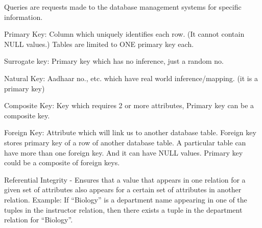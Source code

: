 \documentclass[8pt, a4paper, oneside, twocolumn]{extarticle}
\begin{document}
Queries are requests made to the database management systems for specific information.

Primary Key: Column which uniquely identifies each row. (It cannot contain NULL values.) Tables are limited to ONE primary key each.

Surrogate key: Primary key which has no inference, just a random no.

Natural Key: Aadhaar no., etc. which have real world inference/mapping. (it is a primary key)

Composite Key: Key which requires 2 or more attributes, Primary key can be a composite key. 

Foreign Key: Attribute which will link us to another database table. Foreign key stores primary key of a row of another database table. A particular table can have more than one foreign key. And it can have NULL values. Primary key could be a composite of foreign keys.

Referential Integrity - Ensures that a value that appears in one relation for a given set of attributes also appears for a certain set of attributes in another relation.
Example:  If “Biology” is a department name appearing in one of the tuples in the instructor relation, then there exists a tuple in the department relation for “Biology”.
\end{document}
